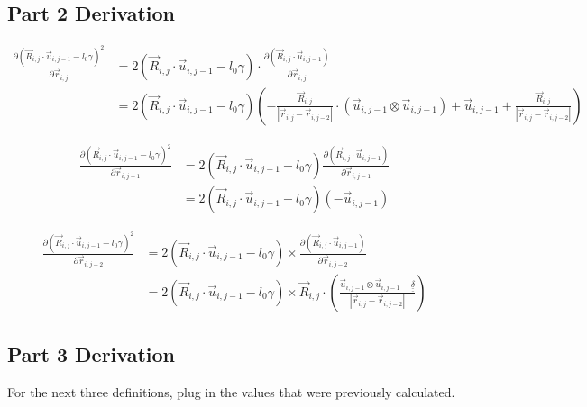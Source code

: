 \documentclass{article}
\renewcommand{\ij}{_{i,j}}
\newcommand{\ijj}{_{i,j-1}}
\newcommand{\ijjj}{_{i,j-2}}
\newcommand{\magn}[1]{\left\vert #1 \right\vert }
\renewcommand{\part}[2]{\frac{\partial #1 }{\partial #2}}
\newcommand{\ten}[1]{\underline{\underline{#1}}}
\newcommand{\rij}{\vec{r} \ij}
\newcommand{\Rij}{\vec{R} \ij}
\newcommand{\rijj}{\vec{r} \ijj}
\newcommand{\rijjj}{\vec{r} \ijjj}
\newcommand{\uijj}{\vec{u} \ijj}
\begin{document}
\subsection{Part 2 Derivation}

\begin{align*}
  \part{\left(\Rij \cdot \uijj - l_0\gamma\right)^2}{\rij }
  &=
2(\Rij \cdot \uijj - l_0\gamma)
\cdot 
\part{\left(\Rij \cdot \uijj\right)}{\rij}
\\
  &=
2(\Rij \cdot \uijj - l_0\gamma)
  \left(
  -\frac{\vec{R} \ij}{\magn{\rij - \rijjj}} \cdot (\uijj \otimes \uijj ) 
  +  \uijj
  +  \frac{\Rij}{\magn{\rij - \rijjj}}
  \right) 
\end{align*}

\begin{align*}
  \part{\left(\Rij \cdot \uijj - l_0\gamma\right)^2}{\rijj }
  &=
2(\Rij \cdot \uijj - l_0\gamma)
\part{\left(\Rij \cdot \uijj\right)}{\rijj}
\\
& =
2(\Rij \cdot \uijj - l_0\gamma)
(- \uijj)
\end{align*}

\begin{align*}
  \part{\left(\Rij \cdot \uijj - l_0\gamma\right)^2}{\rijjj }
  &=
2(\Rij \cdot \uijj - l_0\gamma)
\times
\part{\left(\Rij \cdot \uijj\right)}{\rijjj}
\\
& =
2(\Rij \cdot \uijj - l_0\gamma)
\times
\Rij 
\cdot 
\left(
  \frac{\uijj \otimes \uijj - \ten{\delta}}{\magn{\rij - \rijjj}}
\right)
\end{align*}

\subsection{Part 3 Derivation}
For the next three definitions, plug in the values that were previously calculated. 
\end{document}
